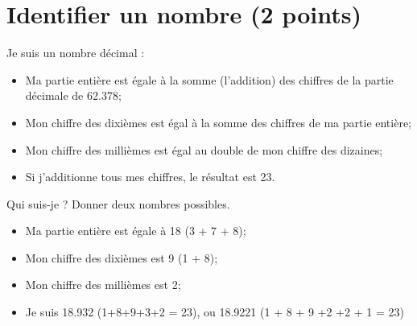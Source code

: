 \section{Identifier un nombre (2 points)}

Je suis un nombre décimal :
\begin{itemize}
	\item Ma partie entière est égale à la somme (l'addition) des chiffres de la partie décimale de \num{62.378};
	\item Mon chiffre des dixièmes est égal à la somme des chiffres de ma partie entière;
	\item Mon chiffre des millièmes est égal au double de mon chiffre des dizaines;
	\item Si j'additionne tous mes chiffres, le résultat est 23.
	
\end{itemize}

\begin{questions}
	\question[2] Qui suis-je ? Donner deux nombres possibles.
	
	\begin{solution}
		\begin{itemize}
			\item Ma partie entière est égale à 18 (3 +  7 + 8);
			\item Mon chiffre des dixièmes est 9 (1 + 8);
			\item Mon chiffre des millièmes est 2;
			\item Je suis \num{18.932} (1+8+9+3+2 = 23), ou \num{18.9221} (1 + 8 + 9 +2 +2 + 1 = 23)
		\end{itemize}
	
	
	\end{solution}
\end{questions}